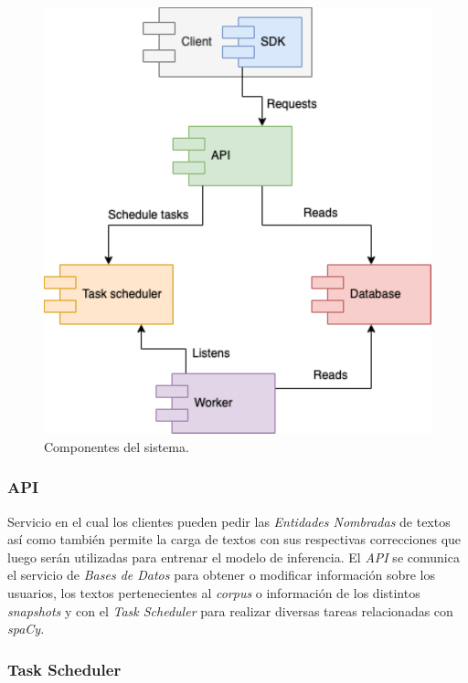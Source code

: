 \documentclass[12pt,a4paper,]{scrartcl}
\begin{document}
\begin{figure}[H]

{\centering \includegraphics{assets/process/process-overview-client.pdf} 

}

\caption{Componentes del sistema.}\label{fig:process-overview-client}
\end{figure}

\hypertarget{api}{%
\subsubsection{API}\label{api}}

Servicio en el cual los clientes pueden pedir las \emph{Entidades Nombradas} de textos así como también permite la carga de textos con sus respectivas correcciones que luego serán utilizadas para entrenar el modelo de inferencia.
El \emph{API} se comunica el servicio de \emph{Bases de Datos} para obtener o modificar información sobre los usuarios, los textos pertenecientes al \emph{corpus} o información de los distintos \emph{snapshots} y con el \emph{Task Scheduler} para realizar diversas tareas relacionadas con \emph{spaCy}.

\hypertarget{task-scheduler}{%
\subsubsection{Task Scheduler}\label{task-scheduler}}
\end{document}
